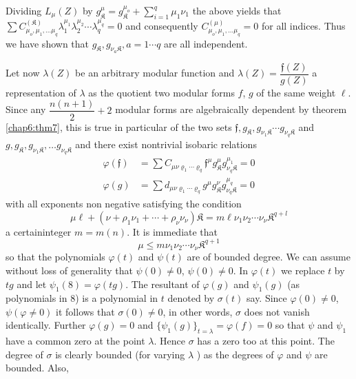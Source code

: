 Dividing $L_{\mu}(Z) $ by $g_{\mathfrak{K}}^{\mu} =
g_{\mathfrak{K}}^{\mu_o }+ \sum_{i = 1 
}^{q} \mu_1 \nu_1$ the above yields  that\break $\sum C_{\mu_o, \mu_1 ,
  \ldots \mu_q }^{(\mathfrak{K})} \lambda_1^{\mu_1} \lambda_{2}^{\mu_2} \cdots
\lambda_q ^{\mu_q} =0$ and consequently $C_{\mu_o, \mu_1 , \ldots
  \mu_q }^{(\mu)} = 0 $ for all indices. Thus we have shown that $g_\mathfrak{K}
, g_{\nu_a \mathfrak{K}}, a =1 \cdots q$ are all independent.  

\medskip
Let now $\lambda (Z)$ be an arbitrary modular function and $\lambda
(Z) = \dfrac{\mathfrak{f}(Z)}{g (Z)}$ a representation of $\lambda$ as
the quotient two modular forms $f$, $g$ of the same weight
$\ell$. Since any $\dfrac{n (n+1)}{2} +2$ modular forms are
algebraically dependent by theorem \ref{chap6:thm7}, this is true in
particular of 
the two sets \break $\mathfrak{f}, g_\mathfrak{K} , g_{\nu_1
  \mathfrak{K}} \cdots g_{\nu_q \mathfrak{K}}$ and 
$g , g_\mathfrak{K}, g_{\nu_1 \mathfrak{K}}, \ldots g_{\nu_q
  \mathfrak{K}}$ and there exist nontrivial isobaric relations 
\begin{align*}
\varphi (\mathfrak{f}) & = \sum C_{\mu \nu \varrho_1 \cdots \varrho_q
} \mathfrak{f}^\mu g_{\mathfrak{K}}^{\mu} g^{\mu_1}_{\nu _q \mathfrak{K}}= 0 \\ 
\varphi (g) & = \sum d_{\mu \nu \varrho_1 \cdots \varrho_q }  g^{\mu}
g_{\mathfrak{K}}^{\nu}g_{\nu_q \mathfrak{K}}^{\mu_q} = 0  
\end{align*}
with all exponents non negative satisfying the condition 
$$
\mu \ell + (\nu + \rho_1 \nu_1 + \cdots + \rho_\nu \nu_\nu ) \mathfrak{K} = m
\ell \nu_1 \nu_2 \cdots \nu_\nu \mathfrak{K}^{q + l} 
$$
a certain\pageoriginale integer $m = m (n)$. It is immediate that  
$$
\mu \le m \nu_1 \nu_2 \cdots \nu_\nu \mathfrak{K}^{q + 1} 
$$
so that the polynomials $\varphi (t)$ and $\psi(t)$ are of bounded
degree. We can assume without loss of generality that $\psi(0) \neq 0$,
$\psi (0) \neq 0$. In $\varphi(t)$ we replace $t$ by $t  g$ and let
$\psi_1(8) = \varphi (t g)$. The resultant of $\varphi (g)$ and
$\psi_1(g)$ (as polynomials in 8) is a polynomial in $t$ denoted by
$\sigma (t)$ say. Since $\varphi (0) \neq 0$, $\psi (\varphi \neq 0)$ it
follows that $\sigma (0) \neq 0$, in other words, $\sigma$ does not
vanish identically. Further $\varphi (g) = 0$ and $\{\psi_1 (g)\}_{t =
  \lambda} = \varphi(f) = 0$ so that $\psi$ and $\psi_1$ have a common
zero at the point $\lambda$. Hence $\sigma$ has a zero too at this
point. The degree of $\sigma$ is clearly bounded (for varying
$\lambda$ ) as the degrees of $\varphi$ and $\psi$ are bounded. Also,
